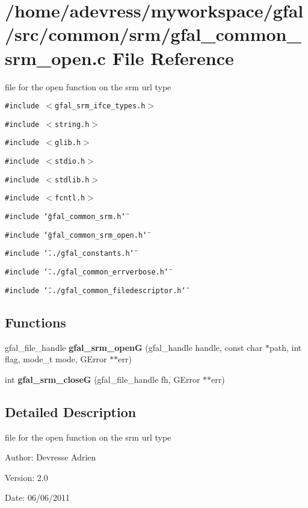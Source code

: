 \section{/home/adevress/myworkspace/gfal/src/common/srm/gfal\_\-common\_\-srm\_\-open.c File Reference}
\label{gfal__common__srm__open_8c}
file for the open function on the srm url type 

{\tt \#include $<$gfal\_\-srm\_\-ifce\_\-types.h$>$}\par
{\tt \#include $<$string.h$>$}\par
{\tt \#include $<$glib.h$>$}\par
{\tt \#include $<$stdio.h$>$}\par
{\tt \#include $<$stdlib.h$>$}\par
{\tt \#include $<$fcntl.h$>$}\par
{\tt \#include \char`\"{}gfal\_\-common\_\-srm.h\char`\"{}}\par
{\tt \#include \char`\"{}gfal\_\-common\_\-srm\_\-open.h\char`\"{}}\par
{\tt \#include \char`\"{}../gfal\_\-constants.h\char`\"{}}\par
{\tt \#include \char`\"{}../gfal\_\-common\_\-errverbose.h\char`\"{}}\par
{\tt \#include \char`\"{}../gfal\_\-common\_\-filedescriptor.h\char`\"{}}\par
\subsection*{Functions}
\begin{CompactItemize}
\item 
gfal\_\-file\_\-handle \textbf{gfal\_\-srm\_\-open\-G} (gfal\_\-handle handle, const char $\ast$path, int flag, mode\_\-t mode, GError $\ast$$\ast$err)\label{gfal__common__srm__open_8c_bb27bc48091a2a9a4ca124a35d3847a5}

\item 
int \textbf{gfal\_\-srm\_\-close\-G} (gfal\_\-file\_\-handle fh, GError $\ast$$\ast$err)\label{gfal__common__srm__open_8c_1b78856858fbfc8244d098fef0231d7d}

\end{CompactItemize}


\subsection{Detailed Description}
file for the open function on the srm url type 

\begin{Desc}
\item[Author:]Devresse Adrien \end{Desc}
\begin{Desc}
\item[Version:]2.0 \end{Desc}
\begin{Desc}
\item[Date:]06/06/2011 \end{Desc}

